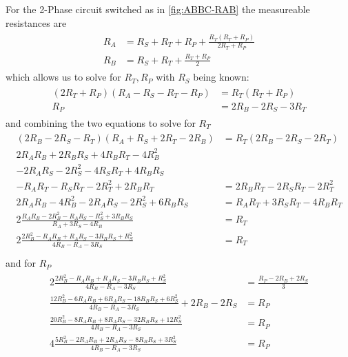 \documentclass[12pt,a4paper,oneside,openany]{article}
\begin{document}
For the 2-Phase circuit switched as in \cref{fig:ABBC-RAB} the measureable resistances are
\begin{gather}
\begin{aligned}
R_A &= R_S + R_T + R_P + \frac{R_T (R_T + R_P)}{2 R_T + R_P} \\
R_B &= R_S + R_T + \frac{R_T + R_P}{2}
\end{aligned}
\end{gather}
which allows us to solve for $R_T, R_P$ with $R_S$ being known:
\begin{gather}
\begin{aligned}
(2 R_T + R_P) (R_A - R_S - R_T - R_P) &= R_T (R_T + R_P) \\
R_P &= 2 R_B - 2 R_S - 3 R_T
\end{aligned}
\end{gather}
and combining the two equations to solve for $R_T$
\begin{gather}
\begin{aligned}
(2 R_B - 2 R_S - R_T) (R_A + R_S + 2 R_T - 2 R_B) &= R_T (2 R_B - 2 R_S - 2 R_T) \\
2 R_A R_B + 2 R_B R_S + 4 R_B R_T - 4 R_B^2 \\
 - 2 R_A R_S - 2 R_S^2 - 4 R_S R_T + 4 R_B R_S\\
 - R_A R_T - R_S R_T - 2 R_T^2 + 2R_B R_T &= 2 R_B R_T - 2 R_S R_T - 2 R_T^2 \\
2 R_A R_B - 4 R_B^2 - 2 R_A R_S - 2 R_S^2 + 6 R_B R_S &= R_A R_T + 3 R_S R_T - 4 R_B R_T\\
2 \frac{ R_A R_B - 2 R_B^2 - R_A R_S - R_S^2 + 3 R_B R_S}{R_A + 3 R_S- 4 R_B} &= R_T\\
2 \frac{ 2 R_B^2 - R_A R_B  + R_A R_S - 3 R_B R_S + R_S^2}{4 R_B - R_A - 3 R_S} &= R_T\\
\end{aligned}
\end{gather}
and for $R_P$
\begin{gather}
\begin{aligned}
2 \frac{ 2 R_B^2 - R_A R_B  + R_A R_S - 3 R_B R_S + R_S^2}{4 R_B - R_A - 3 R_S} &= \frac{R_P - 2 R_B + 2 R_S}{3} \\
\frac{ 12 R_B^2 - 6 R_A R_B  + 6 R_A R_S - 18 R_B R_S + 6 R_S^2}{4 R_B - R_A - 3 R_S} + 2 R_B - 2 R_S &= R_P \\
\frac{ 20 R_B^2 - 8 R_A R_B  + 8 R_A R_S - 32 R_B R_S + 12 R_S^2}{4 R_B - R_A - 3 R_S} &= R_P \\
4 \frac{ 5 R_B^2 - 2 R_A R_B  + 2 R_A R_S - 8 R_B R_S + 3 R_S^2}{4 R_B - R_A - 3 R_S} &= R_P
\end{aligned}
\end{gather}
\end{document}
